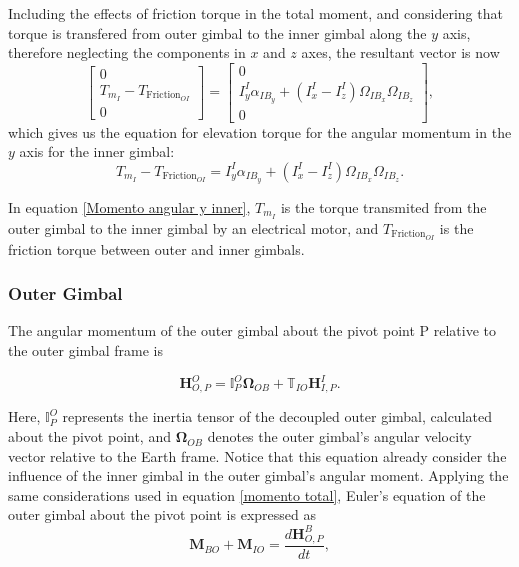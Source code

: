 Including the effects of friction torque in the total moment, and considering that torque is transfered from outer gimbal to the inner gimbal along the $y$ axis, therefore neglecting the components in $x$ and $z$ axes, the resultant vector is now
\begin{equation}
   \left[\begin{matrix} 0 \\ T_{m_I} - T_{\text{Friction}_{OI}} \\ 0\end{matrix}\right] = \left[ \begin{matrix} 0 \\ I^I_y \alpha_{IB_y} + (I^I_x - I^I_z) \Omega_{IB_x} \Omega_{IB_z} \\ 0 \end{matrix}\right],
\end{equation}
which gives us the equation for elevation torque for the angular momentum in the $y$ axis for the inner gimbal:
\begin{equation}
   \label{Momento angular y inner}
   T_{m_I} - T_{\text{Friction}_{OI}} = I^I_y \alpha_{IB_y} + (I^I_x - I^I_z) \Omega_{IB_x} \Omega_{IB_z}. 
\end{equation}

In equation \eqref{Momento angular y inner}, $T_{m_I}$ is the torque transmited from the outer gimbal to the inner gimbal by an electrical motor, and $T_{\text{Friction}_{OI}}$ is the friction torque between outer and inner gimbals.

\subsubsection{Outer Gimbal}
The angular momentum of the outer gimbal about the pivot point P relative to the outer gimbal frame is

\begin{equation}
   \mathbf{H}^O_{O,P} = \mathbb{I}^O_P \mathbf{\Omega}_{OB} + \mathbb{T}_{IO} \mathbf{H}^I_{I,P}.
\end{equation}

Here, $\mathbb{I}^O_P$ represents the inertia tensor of the decoupled outer gimbal, calculated about the pivot point, and $\mathbf{\Omega}_{OB}$ denotes the outer gimbal's angular velocity vector relative to the Earth frame. Notice that this equation already consider the influence of the inner gimbal in the outer gimbal's angular moment. Applying the same considerations used in equation \eqref{momento total}, Euler's equation of the outer gimbal about the pivot point is expressed as
\begin{equation}
\mathbf{M}_{BO} + \mathbf{M}_{IO} = \frac{d\bm{H}^B_{O,P}}{dt},
\end{equation}

